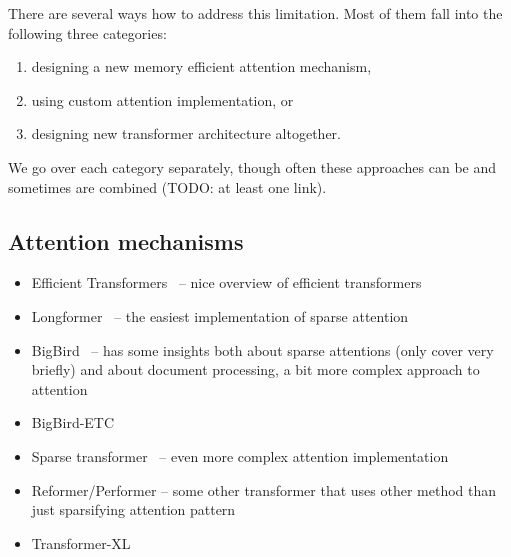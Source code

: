 There are several ways how to address this limitation. Most of them fall into
the following three categories:

\begin{enumerate}

    \item designing a new memory efficient attention mechanism,

    \item using custom attention implementation, or

    \item designing new transformer architecture altogether.

\end{enumerate}

We go over each category separately, though often these approaches can be and
sometimes are combined (TODO: at least one link).

\subsection{Attention mechanisms}

\begin{itemize}

    \item Efficient Transformers~\cite{tay2022efficient} -- nice overview of
    efficient transformers

    \item Longformer~\cite{beltagy2020longformer} -- the easiest implementation
        of sparse attention

    \item BigBird~\cite{zaheer2020big} -- has some insights both about
    sparse attentions (only cover very briefly) and about document processing, a
        bit more complex approach to attention

    \item BigBird-ETC

    \item Sparse transformer~\cite{child2019generating} -- even more complex
        attention implementation

    \item Reformer/Performer -- some other transformer that uses other method
        than just sparsifying attention pattern

    \item Transformer-XL

\end{itemize}


